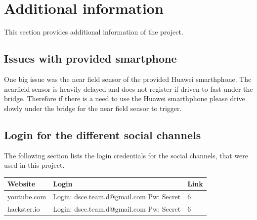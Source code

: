 \section{Additional information}
This section provides additional information of the project. 

\subsection{Issues with provided smartphone}
One big issue was the near field sensor of the provided Huawei smarthphone. The nearfield sensor is heavily delayed and does not register if driven to fast under the bridge. Therefore if there is a need to use the Huawei smarthphone please drive slowly under the bridge for the near field sensor to trigger. 

\subsection{Login for the different social channels}
The following section lists the login credentials for the social channels, that were used in this project.

\begin{tabular}{ l | p{5.6cm} | l }
	Website & Login & Link \\ \hline
	youtube.com & Login: dsce.team.d@gmail.com Pw: Secret & 6 \\
	hackster.io & Login: dsce.team.d@gmail.com Pw: Secret & 6 \\
\end{tabular}
